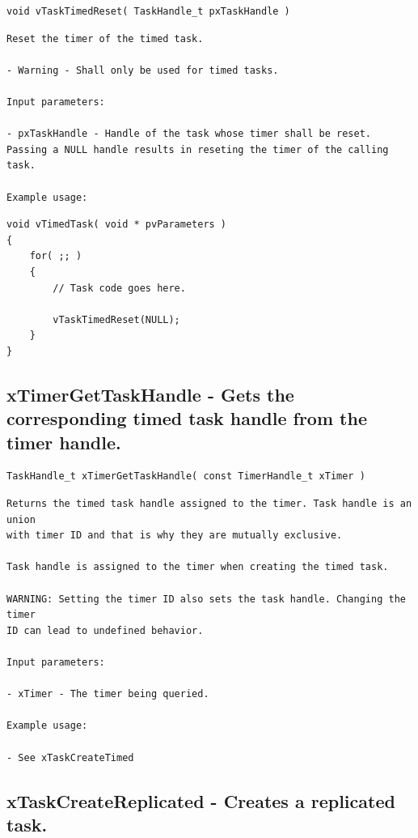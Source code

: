 \begin{verbatim}
void vTaskTimedReset( TaskHandle_t pxTaskHandle )
\end{verbatim}

\begin{lstlisting}
Reset the timer of the timed task.

- Warning - Shall only be used for timed tasks.

Input parameters:

- pxTaskHandle - Handle of the task whose timer shall be reset.
Passing a NULL handle results in reseting the timer of the calling task.

Example usage:
\end{lstlisting}

\begin{verbatim}
void vTimedTask( void * pvParameters )
{
    for( ;; )
    {
        // Task code goes here.

        vTaskTimedReset(NULL);
    }
}
\end{verbatim}

\subsection{xTimerGetTaskHandle -  Gets the corresponding timed task handle from the timer handle.}
\label{rt_cmd:xTimerGetTaskHandle}
\begin{verbatim}
TaskHandle_t xTimerGetTaskHandle( const TimerHandle_t xTimer )
\end{verbatim}
\begin{lstlisting}
Returns the timed task handle assigned to the timer. Task handle is an union
with timer ID and that is why they are mutually exclusive.

Task handle is assigned to the timer when creating the timed task.

WARNING: Setting the timer ID also sets the task handle. Changing the timer
ID can lead to undefined behavior.

Input parameters:

- xTimer - The timer being queried.

Example usage:

- See xTaskCreateTimed

\end{lstlisting}
\subsection{xTaskCreateReplicated -  Creates a replicated task.}
\label{rt_cmd:xTaskCreateReplicated}

